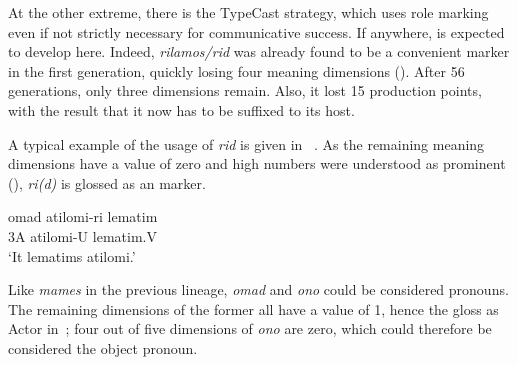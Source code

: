 \documentclass[output=paper]{LSP/langsci}
\begin{document}
At the other extreme, there is the TypeCast strategy, which uses role marking even if not strictly necessary for communicative success. If anywhere,  is expected to develop here. Indeed, \textit{rilamos/rid} was already found to be a convenient marker in the first generation, quickly losing four meaning dimensions (\cf {}). After 56 generations, only three dimensions remain. Also, it lost 15 production points, with the result that it now has to be suffixed to its host. 

\begin{table} 
\caption{Representations of three most frequent words of the TC lineage.\label{17-le-tab:8-TC}}
\end{table}

A typical example of the usage of \textit{rid} is given in~ . As the remaining meaning dimensions have a value of zero and high numbers were understood as prominent (\cf {}), \textit{ri(d)} is glossed as an  marker.

\ea\label{17-le-ex:9} 
\gll omad atilomi-ri lematim\\
3A atilomi-U lematim.V\\
\glt `It lematims atilomi.'
\z

Like \textit{mames }in the previous lineage, \textit{omad} and \textit{ono} could be considered pronouns. The remaining dimensions of the former all have a value of 1, hence the gloss as Actor in~; four out of five dimensions of \textit{ono} are zero, which could therefore be considered the object pronoun. 
\end{document}
